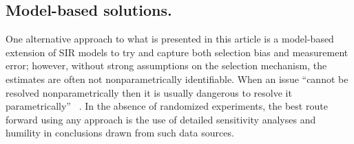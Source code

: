 \documentclass[aoas]{amsart}
\begin{document}

\subsection*{Model-based solutions.}

One alternative approach to what is presented in this article is a model-based extension of SIR models to try and capture both selection bias and measurement error; however, without strong assumptions on the selection mechanism, the estimates are often not nonparametrically identifiable.  When an issue ``cannot be resolved nonparametrically then it is usually dangerous to resolve it parametrically'' ~\cite[pp. 96]{CoxHink74}. In the absence of randomized experiments, the best route forward using any approach is the use of detailed sensitivity analyses and humility in conclusions drawn from such data sources.




\appendix
\end{document}
